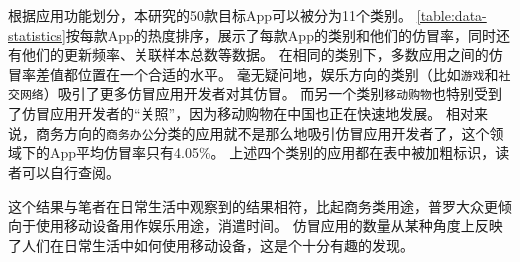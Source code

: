 根据应用功能划分，本研究的50款目标App可以被分为11个类别。
\autoref{table:data-statistics}按每款App的热度排序，展示了每款App的类别和他们的仿冒率，同时还有他们的更新频率、关联样本总数等数据。
在相同的类别下，多数应用之间的仿冒率差值都位置在一个合适的水平。
毫无疑问地，娱乐方向的类别（比如\texttt{游戏}和\texttt{社交网络}）吸引了更多仿冒应用开发者对其仿冒。
而另一个类别\texttt{移动购物}也特别受到了仿冒应用开发者的``关照''，因为移动购物在中国也正在快速地发展。
相对来说，商务方向的\texttt{商务办公}分类的应用就不是那么地吸引仿冒应用开发者了，这个领域下的App平均仿冒率只有4.05\%。
上述四个类别的应用都在表中被加粗标识，读者可以自行查阅。

这个结果与笔者在日常生活中观察到的结果相符，比起商务类用途，普罗大众更倾向于使用移动设备用作娱乐用途，消遣时间。
仿冒应用的数量从某种角度上反映了人们在日常生活中如何使用移动设备，这是个十分有趣的发现。

\vspace{5mm}
\noindent{}

